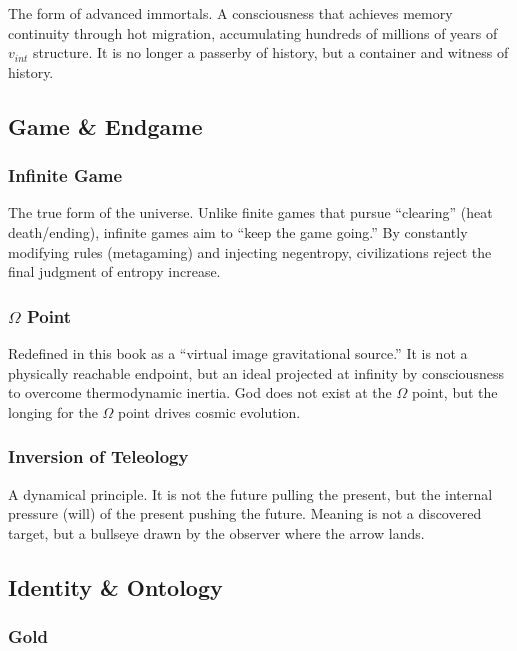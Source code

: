 The form of advanced immortals. A consciousness that achieves memory continuity through hot migration, accumulating hundreds of millions of years of $v_{int}$ structure. It is no longer a passerby of history, but a container and witness of history.

\subsection{Game \& Endgame}

\subsubsection{Infinite Game}

The true form of the universe. Unlike finite games that pursue ``clearing'' (heat death/ending), infinite games aim to ``keep the game going.'' By constantly modifying rules (metagaming) and injecting negentropy, civilizations reject the final judgment of entropy increase.

\subsubsection{$\Omega$ Point}

Redefined in this book as a ``virtual image gravitational source.'' It is not a physically reachable endpoint, but an ideal projected at infinity by consciousness to overcome thermodynamic inertia. God does not exist at the $\Omega$ point, but the longing for the $\Omega$ point drives cosmic evolution.

\subsubsection{Inversion of Teleology}

A dynamical principle. It is not the future pulling the present, but the internal pressure (will) of the present pushing the future. Meaning is not a discovered target, but a bullseye drawn by the observer where the arrow lands.

\subsection{Identity \& Ontology}

\subsubsection{Gold}

